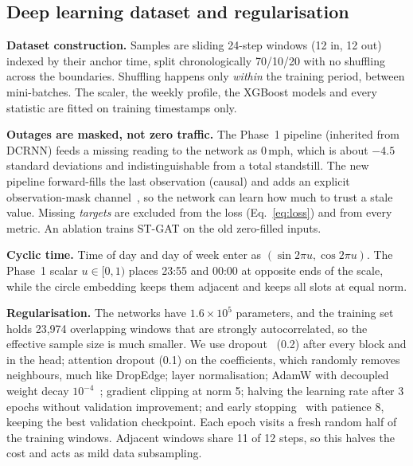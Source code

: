 \subsection{Deep learning dataset and regularisation}
\label{sec:dldata}
\textbf{Dataset construction.} Samples are sliding 24-step windows (12 in, 12
out) indexed by their anchor time, split chronologically 70/10/20 with no shuffling
across the boundaries. Shuffling happens only \emph{within} the training period,
between mini-batches. The scaler, the weekly profile, the XGBoost models and every
statistic are fitted on training timestamps only.

\textbf{Outages are masked, not zero traffic.} The Phase~1 pipeline (inherited
from DCRNN) feeds a missing reading to the network as $0$\,mph, which is about
$-4.5$ standard deviations and indistinguishable from a total standstill. The new
pipeline forward-fills the last observation (causal) and adds an explicit
observation-mask channel~\cite{che2018grud}, so the network can learn how much to
trust a stale value. Missing \emph{targets} are excluded from the loss
(Eq.~\eqref{eq:loss}) and from every metric. An ablation trains ST-GAT on the old
zero-filled inputs.

\textbf{Cyclic time.} Time of day and day of week enter as
$(\sin 2\pi u,\cos 2\pi u)$. The Phase~1 scalar $u\in[0,1)$ places 23:55 and 00:00
at opposite ends of the scale, while the circle embedding keeps them adjacent and
keeps all slots at equal norm.

\textbf{Regularisation.} The networks have $1.6\times10^5$ parameters, and the
training set holds 23,974 overlapping windows that are strongly autocorrelated, so
the effective sample size is much smaller. We use dropout~\cite{srivastava2014dropout}
(0.2) after every block and in the head; attention dropout (0.1) on the
coefficients, which randomly removes neighbours, much like DropEdge; layer
normalisation; AdamW with decoupled weight decay $10^{-4}$~\cite{loshchilov2019adamw};
gradient clipping at norm 5; halving the learning rate after 3 epochs without
validation improvement; and early stopping~\cite{prechelt1998} with patience 8,
keeping the best validation checkpoint. Each epoch visits a fresh random half of the
training windows. Adjacent windows share 11 of 12 steps, so this halves the cost and
acts as mild data subsampling.
